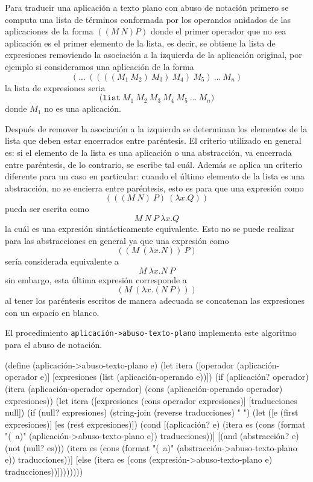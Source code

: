 \documentclass[letterpaper,twoside,openright,11pt]{book}
\begin{document}
Para traducir una aplicación a texto plano con abuso de notación primero se computa una lista de términos conformada por los operandos anidados de las aplicaciones de la forma \( ((M\ N) P) \) donde el primer operador que no sea aplicación es el primer elemento de la lista, es decir, se obtiene la lista de expresiones removiendo la asociación a la izquierda de la aplicación original, por ejemplo si consideramos una aplicación de la forma\[ (...\ ((((M_{1}\ M_{2})\ M_{3})\ M_{4})\ M_{5})\ ...\ M_{n}) \]la lista de expresiones seria\[ \mathtt{(list}\ M_{1}\ M_{2}\ M_{3}\ M_{4}\ M_{5}\ ...\ M_{n} \mathtt{)} \]donde \( M_{1} \) no es una aplicación.

Después de remover la asociación a la izquierda se determinan los elementos de la lista que deben estar encerrados entre paréntesis. El criterio utilizado en general es: si el elemento de la lista es una aplicación o una abstracción, va encerrada entre paréntesis, de lo contrario, se escribe tal cuál. Además se aplica un criterio diferente para un caso en particular: cuando el último elemento de la lista es una abstracción, no se encierra entre paréntesis, esto es para que una expresión como\[ (((M\ N)\ P)\ (λx.Q)) \]pueda ser escrita como\[ M\ N\ P\ λx.Q \]la cuál es una expresión sintácticamente equivalente. Esto no se puede realizar para las abstracciones en general ya que una expresión como\[ ((M\ (λx.N))\ P) \]sería considerada equivalente a\[ M\ λx.N\ P \]sin embargo, esta última expresión corresponde a\[ (M\ (λx.(N\ P))) \]al tener los paréntesis escritos de manera adecuada se concatenan las expresiones con un espacio en blanco.

El procedimiento {\tt{}\protect{}aplicación\protect{}->abuso-texto-plano} implementa este algoritmo para el abuso de notación.

\nwenddocs{}\plusendmoddef
(define (aplicación->abuso-texto-plano e)
  (let itera ([operador    (aplicación-operador e)]
              [expresiones (list (aplicación-operando e))])
    (if (aplicación? operador)
        (itera (aplicación-operador operador)
               (cons (aplicación-operando operador) expresiones))
        (let itera ([expresiones  (cons operador expresiones)]
                    [traducciones null])
          (if (null? expresiones)
              (string-join (reverse traducciones) " ")
              (let ([e  (first expresiones)]
                    [es (rest  expresiones)])
                (cond
                 [(aplicación? e)
                  (itera es (cons (format "(~a)" (aplicación->abuso-texto-plano e))
                                  traducciones))]
                 [(and (abstracción? e) (not (null? es)))
                  (itera es (cons (format "(~a)" (abstracción->abuso-texto-plano e))
                                  traducciones))]
                 [else
                  (itera es (cons (expresión->abuso-texto-plano e)
                                  traducciones))])))))))
\end{document}
